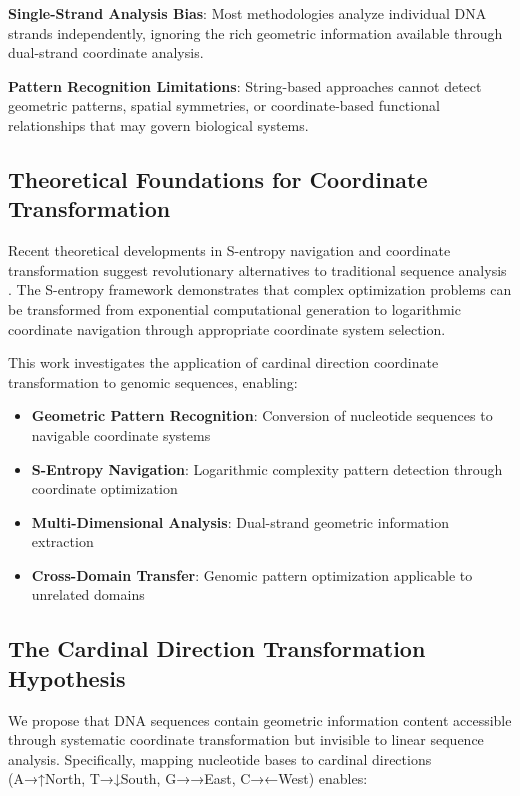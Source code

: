 \documentclass[12pt,a4paper]{article}
\begin{document}
\textbf{Single-Strand Analysis Bias}: Most methodologies analyze individual DNA strands independently, ignoring the rich geometric information available through dual-strand coordinate analysis.

\textbf{Pattern Recognition Limitations}: String-based approaches cannot detect geometric patterns, spatial symmetries, or coordinate-based functional relationships that may govern biological systems.

\subsection{Theoretical Foundations for Coordinate Transformation}

Recent theoretical developments in S-entropy navigation and coordinate transformation suggest revolutionary alternatives to traditional sequence analysis \cite{cover2006elements}. The S-entropy framework demonstrates that complex optimization problems can be transformed from exponential computational generation to logarithmic coordinate navigation through appropriate coordinate system selection.

This work investigates the application of cardinal direction coordinate transformation to genomic sequences, enabling:

\begin{itemize}
\item \textbf{Geometric Pattern Recognition}: Conversion of nucleotide sequences to navigable coordinate systems
\item \textbf{S-Entropy Navigation}: Logarithmic complexity pattern detection through coordinate optimization
\item \textbf{Multi-Dimensional Analysis}: Dual-strand geometric information extraction
\item \textbf{Cross-Domain Transfer}: Genomic pattern optimization applicable to unrelated domains
\end{itemize}

\subsection{The Cardinal Direction Transformation Hypothesis}

We propose that DNA sequences contain geometric information content accessible through systematic coordinate transformation but invisible to linear sequence analysis. Specifically, mapping nucleotide bases to cardinal directions (A→↑North, T→↓South, G→→East, C→←West) enables:
\end{document}
